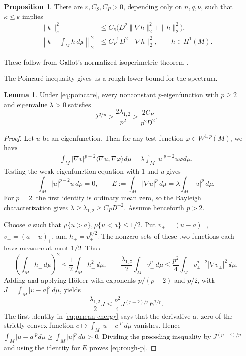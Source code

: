 \documentclass[11pt]{amsart}
\def \eps {\varepsilon}
\theoremstyle{definition}
\newtheorem{lemma}[theorem]{Lemma}
\newtheorem{proposition}[theorem]{Proposition}
\begin{document}
\begin{proposition}\label{prop:geometry}
There are $\eps,C_S,C_P>0$, depending only on
$n,q,\nu$, such that $\kappa\le\eps$ implies
\begin{align}
 \|h\|_{s}^2
 &\le C_S\bigl(D^2\|\nabla h\|_2^2+\|h\|_2^2\bigr),
 \label{eq:sobolev}\\
 \left\|h-\int_Mh\,d\mu\right\|_2^2
 &\le C_P^{-1}D^2\|\nabla h\|_2^2,
 \qquad h\in H^1(M).
 \label{eq:poincare}
\end{align}
\end{proposition}

These follow from Gallot's normalized isoperimetric theorem
\cite[Theorem~3, Theorem~6]{Gallot1988}.

The Poincar\'e inequality gives us a rough lower bound for the spectrum.
\begin{lemma}
\label{lem:rough-p}
Under \eqref{eq:poincare}, every nonconstant $p$-eigenfunction with
$p\ge2$ and eigenvalue $\lambda>0$ satisfies
\begin{equation}\label{eq:rough-p}
 \lambda^{2/p}\ge\frac{2\lambda_{1,2}}{p^2}
                  \ge\frac{2C_P}{p^2D^2}.
\end{equation}
\end{lemma}
\begin{proof}
Let $u$ be an eigenfunction.  Then for any test function $\varphi \in W^{1,p}(M)$, we have
\begin{align*}
    \int_M|\nabla u|^{p-2}\langle \nabla u,\nabla \varphi\rangle d\mu=\lambda\int_M|u|^{p-2}u\varphi d\mu.
\end{align*}
Testing the weak eigenfunction equation with $1$ and $u$ gives
\begin{equation}\label{eq:pmean-energy}
 \int_M|u|^{p-2}u\,d\mu=0,\qquad
 E:=\int_M|\nabla u|^p\,d\mu
       =\lambda\int_M|u|^p\,d\mu.
\end{equation}
For $p=2$, the first identity is ordinary mean zero, so the Rayleigh
characterization gives $\lambda\ge\lambda_{1,2}\ge C_PD^{-2}$.
Assume henceforth $p>2$.

Choose $a$ such that
$\mu\{u>a\},\mu\{u<a\}\le1/2$. Put
$v_+=(u-a)_+$, $v_-=(a-u)_+$, and $h_\pm=v_\pm^{p/2}$.
The nonzero sets of these two functions each have measure at most
$1/2$. Thus
\[
 \left(\int_Mh_\pm\,d\mu\right)^2
 \le\frac12\int_Mh_\pm^2\,d\mu,
 \qquad
 \frac{\lambda_{1,2}}2\int_Mv_\pm^p\,d\mu
 \le\frac{p^2}{4}\int_Mv_\pm^{p-2}|\nabla v_\pm|^2\,d\mu.
\]
Adding and applying H\"older with exponents $p/(p-2)$ and $p/2$,
with $J=\int_M|u-a|^p\,d\mu$, yields
\[
 \frac{\lambda_{1,2}}2J
 \le\frac{p^2}{4}J^{(p-2)/p}E^{2/p}.
\]
The first identity in \eqref{eq:pmean-energy} says that the derivative at zero of the
strictly convex function $c\mapsto\int_M|u-c|^p\,d\mu$ vanishes.
Hence $\int_M|u-a|^pd\mu\ge\int_M|u|^p\,d\mu>0$. Dividing the preceding inequality
by $J^{(p-2)/p}$ and using the identity for $E$ proves
\eqref{eq:rough-p}.
\end{proof}
\end{document}
